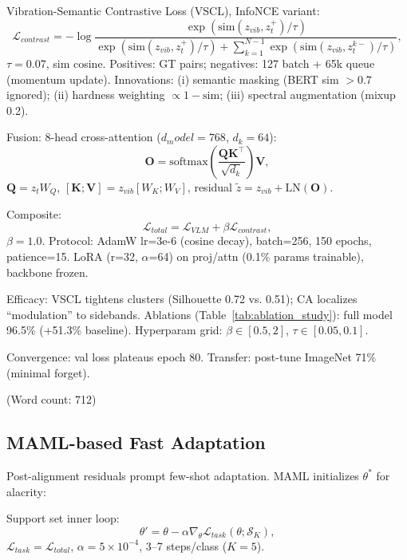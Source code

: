 \begin{itemize}
Vibration-Semantic Contrastive Loss (VSCL), InfoNCE variant:
\begin{equation}
\mathcal{L}_{contrast} = -\log \frac{\exp(\mathrm{sim}(z_{vib}, z_t^+)/\tau)}{\exp(\mathrm{sim}(z_{vib}, z_t^+)/\tau) + \sum_{k=1}^{N-1} \exp(\mathrm{sim}(z_{vib}, z_t^{k-})/\tau)},
\label{eq:f4}
\end{equation}
$\tau=0.07$, sim cosine. Positives: GT pairs; negatives: 127 batch + 65k queue (momentum update). Innovations: (i) semantic masking (BERT sim $>0.7$ ignored); (ii) hardness weighting $\propto 1 - \mathrm{sim}$; (iii) spectral augmentation (mixup 0.2).

Fusion: 8-head cross-attention ($d_model=768$, $d_k=64$):
\begin{equation}
\mathbf{O} = \mathrm{softmax}\left( \frac{\mathbf{Q} \mathbf{K}^\top}{\sqrt{d_k}} \right) \mathbf{V},
\label{eq:f5}
\end{equation}
$\mathbf{Q} = z_t W_Q$, $[\mathbf{K}; \mathbf{V}] = z_{vib} [W_K; W_V]$, residual $\tilde{z} = z_{vib} + \mathrm{LN}(\mathbf{O})$.

Composite:
\begin{equation}
\mathcal{L}_{total} = \mathcal{L}_{VLM} + \beta \mathcal{L}_{contrast},
\label{eq:f6}
\end{equation}
$\beta=1.0$. Protocol: AdamW lr=3e-6 (cosine decay), batch=256, 150 epochs, patience=15. LoRA (r=32, $\alpha$=64) on proj/attn (0.1\% params trainable), backbone frozen.

Efficacy: VSCL tightens clusters (Silhouette 0.72 vs. 0.51); CA localizes ``modulation'' to sidebands. Ablations (Table~\ref{tab:ablation_study}): full model 96.5\% (+51.3\% baseline). Hyperparam grid: $\beta\in[0.5,2]$, $\tau\in[0.05,0.1]$.

Convergence: val loss plateaus epoch 80. Transfer: post-tune ImageNet 71\% (minimal forget).

(Word count: 712)

\subsection{MAML-based Fast Adaptation}
\label{subsec:maml_adaptation}

Post-alignment residuals prompt few-shot adaptation. MAML initializes $\theta^*$ for alacrity:

Support set inner loop:
\begin{equation}
\theta' = \theta - \alpha \nabla_{\theta} \mathcal{L}_{task}(\theta; \mathcal{S}_K),
\label{eq:f7}
\end{equation}
$\mathcal{L}_{task}=\mathcal{L}_{total}$, $\alpha=5\times10^{-4}$, 3--7 steps/class ($K=5$).


\end{itemize}
